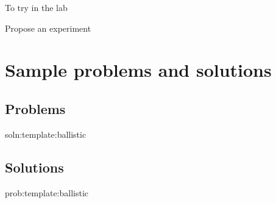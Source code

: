 \begin{chapteractivity}{To try in the lab}
{
\item Propose an experiment
}
\end{chapteractivity}

\newpage
\section{Sample problems and solutions}
\subsection{Problems}
\begin{problem}{soln:template:ballistic}{\label{prob:template:ballistic} 

}
\end{problem}

\newpage
\subsection{Solutions}
\begin{solution}{prob:template:ballistic}\label{soln:template:ballistic}

\end{solution}


